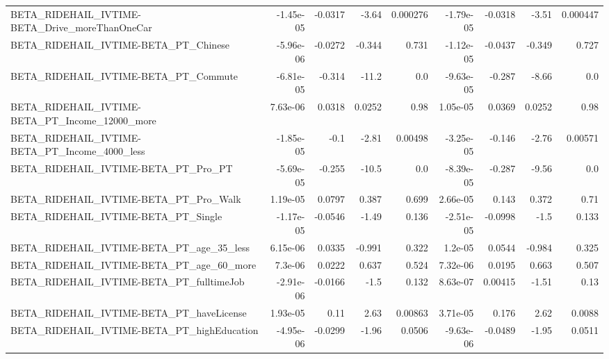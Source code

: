 \begin{tabular}{lrrrrrrrr}
BETA\_RIDEHAIL\_IVTIME-BETA\_Drive\_moreThanOneCar     &   -1.45e-05 &      -0.0317 &     -3.64 & 0.000276 &  -1.79e-05 &     -0.0318 &        -3.51 &      0.000447 \\
BETA\_RIDEHAIL\_IVTIME-BETA\_PT\_Chinese               &   -5.96e-06 &      -0.0272 &    -0.344 &    0.731 &  -1.12e-05 &     -0.0437 &       -0.349 &         0.727 \\
BETA\_RIDEHAIL\_IVTIME-BETA\_PT\_Commute               &   -6.81e-05 &       -0.314 &     -11.2 &      0.0 &  -9.63e-05 &      -0.287 &        -8.66 &           0.0 \\
BETA\_RIDEHAIL\_IVTIME-BETA\_PT\_Income\_12000\_more     &    7.63e-06 &       0.0318 &    0.0252 &     0.98 &   1.05e-05 &      0.0369 &       0.0252 &          0.98 \\
BETA\_RIDEHAIL\_IVTIME-BETA\_PT\_Income\_4000\_less      &   -1.85e-05 &         -0.1 &     -2.81 &  0.00498 &  -3.25e-05 &      -0.146 &        -2.76 &       0.00571 \\
BETA\_RIDEHAIL\_IVTIME-BETA\_PT\_Pro\_PT                &   -5.69e-05 &       -0.255 &     -10.5 &      0.0 &  -8.39e-05 &      -0.287 &        -9.56 &           0.0 \\
BETA\_RIDEHAIL\_IVTIME-BETA\_PT\_Pro\_Walk              &    1.19e-05 &       0.0797 &     0.387 &    0.699 &   2.66e-05 &       0.143 &        0.372 &          0.71 \\
BETA\_RIDEHAIL\_IVTIME-BETA\_PT\_Single                &   -1.17e-05 &      -0.0546 &     -1.49 &    0.136 &  -2.51e-05 &     -0.0998 &         -1.5 &         0.133 \\
BETA\_RIDEHAIL\_IVTIME-BETA\_PT\_age\_35\_less           &    6.15e-06 &       0.0335 &    -0.991 &    0.322 &    1.2e-05 &      0.0544 &       -0.984 &         0.325 \\
BETA\_RIDEHAIL\_IVTIME-BETA\_PT\_age\_60\_more           &     7.3e-06 &       0.0222 &     0.637 &    0.524 &   7.32e-06 &      0.0195 &        0.663 &         0.507 \\
BETA\_RIDEHAIL\_IVTIME-BETA\_PT\_fulltimeJob           &   -2.91e-06 &      -0.0166 &      -1.5 &    0.132 &   8.63e-07 &     0.00415 &        -1.51 &          0.13 \\
BETA\_RIDEHAIL\_IVTIME-BETA\_PT\_haveLicense           &    1.93e-05 &         0.11 &      2.63 &  0.00863 &   3.71e-05 &       0.176 &         2.62 &        0.0088 \\
BETA\_RIDEHAIL\_IVTIME-BETA\_PT\_highEducation         &   -4.95e-06 &      -0.0299 &     -1.96 &   0.0506 &  -9.63e-06 &     -0.0489 &        -1.95 &        0.0511 \\

\end{tabular}
